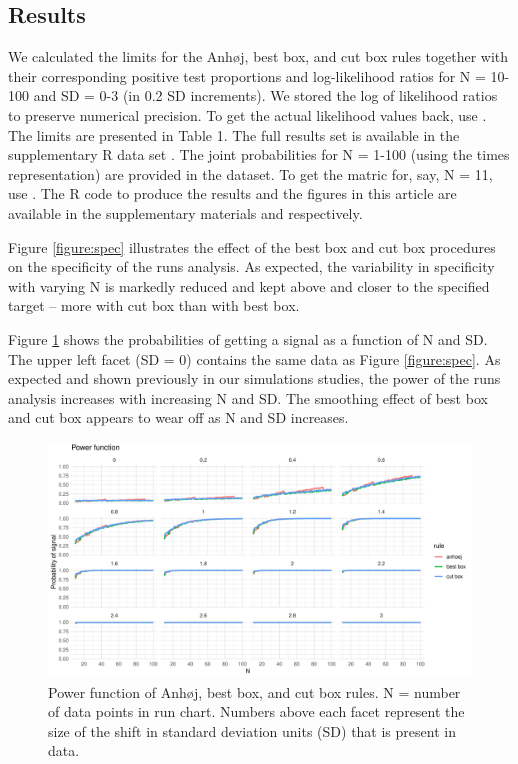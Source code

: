 \hypertarget{results}{%
\subsection{Results}\label{results}}

We calculated the limits for the Anhøj, best box, and cut box rules
together with their corresponding positive test proportions and
log-likelihood ratios for N = 10-100 and SD = 0-3 (in 0.2 SD
increments). We stored the log of likelihood ratios to preserve
numerical precision. To get the actual likelihood values back, use
. The limits are presented in Table 1. The
full results set is available in the supplementary R data set
. The joint probabilities for N = 1-100 (using the
times representation) are provided in the  dataset.
To get the matric for, say, N = 11, use . The R
code to produce the results and the figures in this article are
available in the supplementary materials  and
 respectively.

Figure \ref{figure:spec} illustrates the effect of the best box and cut
box procedures on the specificity of the runs analysis. As expected, the
variability in specificity with varying N is markedly reduced and kept
above and closer to the specified target -- more with cut box than with
best box.

Figure \ref{figure:pwr} shows the probabilities of getting a signal as a
function of N and SD. The upper left facet (SD = 0) contains the same
data as Figure \ref{figure:spec}. As expected and shown previously in
our simulations studies, the power of the runs analysis increases with
increasing N and SD. The smoothing effect of best box and cut box
appears to wear off as N and SD increases.

\begin{figure}[htbp]
  \centering
  \includegraphics[width=\textwidth]{fig_pwr.pdf}
  \caption{Power function of Anhøj, best box, and cut box rules.
           N = number of data points in run chart.
           Numbers above each facet represent the size of the shift in standard
           deviation units (SD) that is present in data.}
  \label{figure:pwr}
\end{figure}

